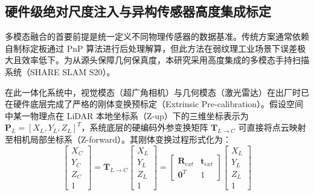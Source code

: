 \subsection{硬件级绝对尺度注入与异构传感器高度集成标定}
\label{subsec:scale_injection}

多模态融合的首要前提是统一定义不同物理传感器的数据基准。传统方案通常依赖自制标定板通过 PnP 算法进行后处理解算，但此方法在弱纹理工业场景下误差极大且效率低下。为从源头保障几何保真度，本研究采用高度集成的多模态手持扫描系统（SHARE SLAM S20）。

在此一体化系统中，视觉模态（超广角相机）与几何模态（激光雷达）在出厂时已在硬件底层完成了严格的刚体变换预标定（Extrinsic Pre-calibration）。假设空间中某一物理点在 LiDAR 本地坐标系（Z-up）下的三维坐标表示为 $\bm{P}_{L} = [X_L, Y_L, Z_L]^T$，系统底层的硬编码外参变换矩阵 $\bm{T}_{L \to C}$ 可直接将点云映射至相机局部坐标系（Z-forward）。其刚体变换过程形式化为：
\begin{equation}
    \begin{bmatrix} X_C \\ Y_C \\ Z_C \\ 1 \end{bmatrix} = \bm{T}_{L \to C} \begin{bmatrix} X_L \\ Y_L \\ Z_L \\ 1 \end{bmatrix} = \begin{bmatrix} \bm{R}_{ext} & \bm{t}_{ext} \\ \mathbf{0}^T & 1 \end{bmatrix} \begin{bmatrix} X_L \\ Y_L \\ Z_L \\ 1 \end{bmatrix}
    \label{eq:coordinate_transform}
\end{equation}

